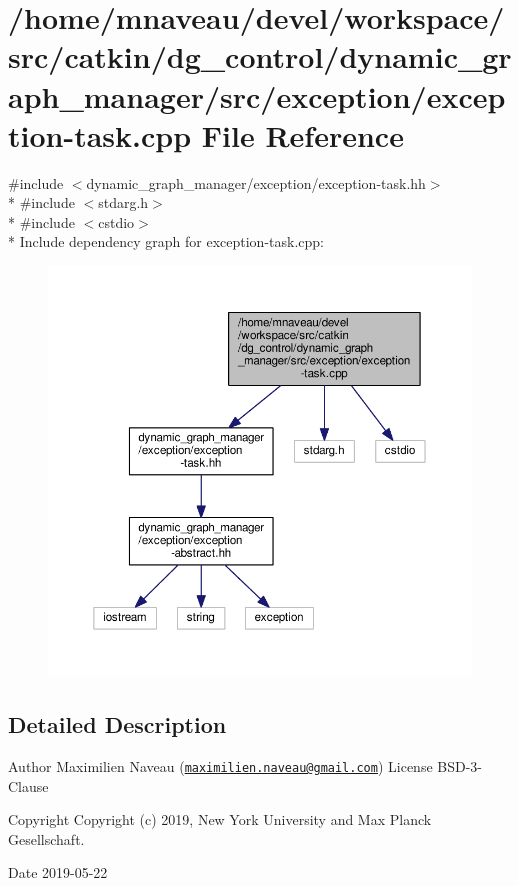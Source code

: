 \hypertarget{exception-task_8cpp}{}\section{/home/mnaveau/devel/workspace/src/catkin/dg\+\_\+control/dynamic\+\_\+graph\+\_\+manager/src/exception/exception-\/task.cpp File Reference}
\label{exception-task_8cpp}
{\ttfamily \#include $<$dynamic\+\_\+graph\+\_\+manager/exception/exception-\/task.\+hh$>$}\\*
{\ttfamily \#include $<$stdarg.\+h$>$}\\*
{\ttfamily \#include $<$cstdio$>$}\\*
Include dependency graph for exception-\/task.cpp\+:\nopagebreak
\begin{figure}[H]
\begin{center}
\leavevmode
\includegraphics[width=350pt]{exception-task_8cpp__incl}
\end{center}
\end{figure}


\subsection{Detailed Description}
\begin{DoxyAuthor}{Author}
Maximilien Naveau (\href{mailto:maximilien.naveau@gmail.com}{\tt maximilien.\+naveau@gmail.\+com})  License B\+S\+D-\/3-\/\+Clause 
\end{DoxyAuthor}
\begin{DoxyCopyright}{Copyright}
Copyright (c) 2019, New York University and Max Planck Gesellschaft. 
\end{DoxyCopyright}
\begin{DoxyDate}{Date}
2019-\/05-\/22 
\end{DoxyDate}
